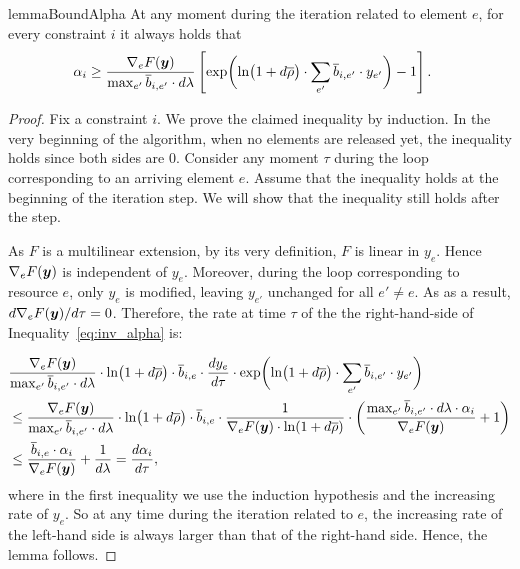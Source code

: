 \begin{restatable}{lemma}{BoundAlpha}
\label{lem:bound-alpha}
At any moment during the iteration related to element $e$,  
for every constraint $i$
it always holds that 
\begin{align}
\alpha_{i}	&\geq  \frac{\nabla_{e} F(\bm{y})}{\max_{e'}  \overline{b}_{i,e'}  \cdot d \lambda} 
		\left[ \exp\biggl( \ln \bigl(1+ d\overline{\rho} \bigr) 
				\cdot \sum_{e'} \overline{b}_{i,e'}  \cdot y_{e'}  \biggr) - 1 \right]. \label{eq:inv_alpha}
\end{align}
\end{restatable}
\begin{proof}
Fix a constraint $i$. We prove the claimed inequality by induction.
In the very beginning of the algorithm, when no elements are released yet, the inequality holds since both sides are 0.  
Consider any moment $\tau$ during the loop corresponding to an arriving element $e$.
Assume that the inequality holds at the beginning of the iteration step. We will show that the inequality still holds after the step.

As $F$ is a multilinear extension, by its very definition, $F$ is linear in $y_{e}$. Hence 
$\nabla_{e} F(\bm{y})$ is independent of $y_{e} $. 
Moreover, during the loop corresponding to resource $e$, only $y_{e} $ is modified, leaving  $y_{e'} $ unchanged for all $e' \neq e$.  
As as a result, 
$d \nabla_{e} F(\bm{y})/d \tau = 0$. Therefore, the rate at time $\tau$ of the the right-hand-side of Inequality~\eqref{eq:inv_alpha} is:

\begin{align*}
&\frac{\nabla_{e} F(\vect{y})}{\max_{e'}  \overline{b}_{i,e'}  \cdot d \lambda } \cdot \ln \bigl(1+ d\overline{\rho} \bigr) \cdot \overline{b}_{i,e}  \cdot
		 \frac{d y_{e} }{d \tau} \cdot \exp \biggl( \ln \bigl(1+ d\overline{\rho} \bigr) \cdot \sum_{e'} \overline{b}_{i,e'}  \cdot y_{e'}  \biggr) \\
%
&\leq  
\frac{\nabla_{e} F(\vect{y})}{\max_{e'}  \overline{b}_{i,e'}  \cdot d \lambda} \cdot \ln \bigl(1+ d\overline{\rho} \bigr) \cdot \overline{b}_{i,e}  \cdot
		 \frac{1}{\nabla_{e} F(\vect{y}) \cdot \ln(1+ d\overline{\rho} )}
		 \cdot \biggl( \frac{\max_{e'} \overline{b}_{i,e'}  \cdot d\lambda \cdot \alpha_{i}}{ \nabla_{e} F(\vect{y}) } + 1 \biggr) \\
%
&\leq \frac{\overline{b}_{i,e}  \cdot \alpha_{i}}{\nabla_{e} F(\vect{y})}  + \frac{1}{d \lambda} = \frac{d\alpha_{i}}{d \tau},
\end{align*}
%
where in the first inequality we use the induction hypothesis and the increasing rate of $y_{e}$.
So at any time during the iteration related to $e$, the increasing rate of the left-hand side is always larger than that of the right-hand side. 
Hence, the lemma follows.
\end{proof}

